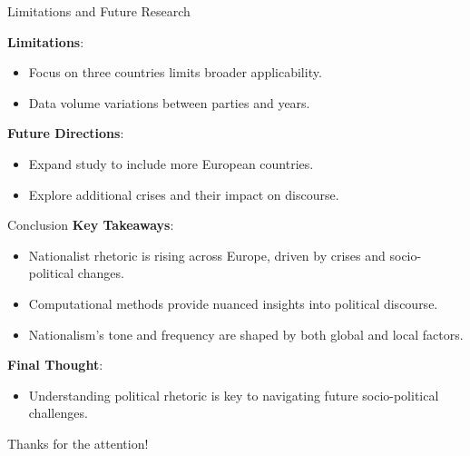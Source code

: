 \documentclass[8pt]{beamer}
\begin{document}
\begin{frame}{Limitations and Future Research}

    \textbf{Limitations}:
        \begin{itemize}
            \item Focus on three countries limits broader applicability.
\item  Data volume variations between parties and years.
        \end{itemize}
        \textbf{Future Directions}:
        \begin{itemize}
            \item Expand study to include more European countries.
            \item  Explore additional crises and their impact on discourse.
        \end{itemize}
    
\end{frame}

\begin{frame}{Conclusion}
\textbf{Key Takeaways}:
\begin{itemize}
    \item Nationalist rhetoric is rising across Europe, driven by crises and socio-political changes.
\item  Computational methods provide nuanced insights into political discourse.
\item  Nationalism’s tone and frequency are shaped by both global and local factors.
\end{itemize}
\textbf{Final Thought}:
\begin{itemize}
    \item Understanding political rhetoric is key to navigating future socio-political challenges.
\end{itemize}
    
\end{frame}

\begin{frame}{}
    Thanks for the attention!
\end{frame}




\end{document}

